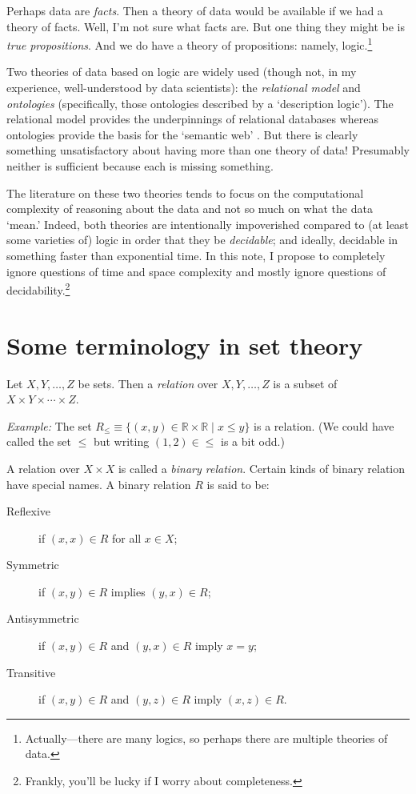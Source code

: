 \documentclass[10pt, a4paper, twocolumn]{article}
\begin{document}
Perhaps data are \emph{facts}. Then a theory of data would be available if we
had a theory of facts. Well, I'm not sure what facts are. But one thing they
might be is \emph{true} \emph{propositions}. And we do have a theory of
propositions: namely, logic.\footnote{Actually---there are many logics, so perhaps
there are multiple theories of data.}

Two theories of data based on logic are widely used (though not, in my
experience, well-understood by data scientists): the \emph{relational model} and
\emph{ontologies} (specifically, those ontologies described by a `description
logic'). The relational model provides the underpinnings of relational databases
\parencite{codd1970relational} whereas ontologies provide the basis for the
`semantic web' \parencite{DBLP:journals/corr/abs-1201-4089}. But there is
clearly something unsatisfactory about having more than one theory of data!
Presumably neither is sufficient because each is missing something.

The literature on these two theories tends to focus on the computational
complexity of reasoning about the data and not so much on what the data `mean.'
Indeed, both theories are intentionally impoverished compared to (at least some
varieties of) logic in order that they be \emph{decidable}; and ideally,
decidable in something faster than exponential time. In this note, I propose to
completely ignore questions of time and space complexity and mostly ignore
questions of decidability.\footnote{Frankly, you'll be lucky if I worry about
completeness.}

\section{Some terminology in set theory}

Let $X, Y, \dots, Z$ be sets. Then a \emph{relation} over $X, Y, \dots, Z$ is a
subset of $X\times Y\times\dotsm\times Z$.

\emph{Example:} The set $R_\leq \equiv \{(x, y)\in\mathbb{R}\times\mathbb{R} \mid x\leq y\}$ is a
relation. (We could have called the set $\leq$ but writing $(1, 2)\in\leq$ is a bit odd.)

A relation over $X\times X$ is called a \emph{binary relation}. Certain
kinds of binary relation have special names. A binary relation $R$ is said to
be:
\begin{description}
\item[Reflexive] if $(x, x)\in R$ for all $x\in X$;
\item[Symmetric] if $(x, y)\in R$ implies $(y,x)\in R$;
\item[Antisymmetric] if $(x, y)\in R$ and $(y, x)\in R$ imply $x = y$;
\item[Transitive] if $(x, y)\in R$ and $(y, z)\in R$ imply $(x, z) \in R$.
\end{description}
\end{document}

